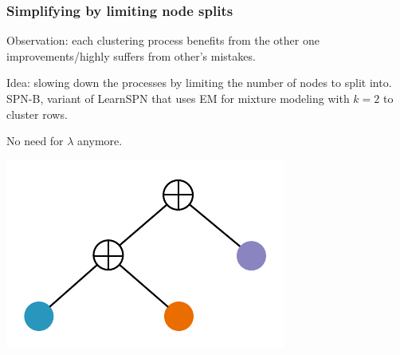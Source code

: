 \documentclass[xcolor={usenames,dvipsnames,svgnames}, compress]{beamer}
\begin{document}
\begin{frame}
  \frametitle{Simplifying by limiting node splits}
  \footnotesize

  Observation: each clustering process benefits from the other one improvements/highly suffers
  from other's mistakes.\par\bigskip

  Idea: slowing down the processes by limiting the number of
  nodes to split into. \textsf{SPN-B}, variant of \textsf{LearnSPN} that uses EM
  for mixture modeling with
  $k=2$ to cluster rows.

  No need for $\lambda$ anymore.\par\bigskip

  \hspace{-5pt}\begin{minipage}[t]{0.3\linewidth}
    \begin{center}
      \includegraphics[width=0.9\linewidth]{figures/learnspn-4.pdf}
    \end{center}
  \end{minipage}
\end{frame}
\end{document}
